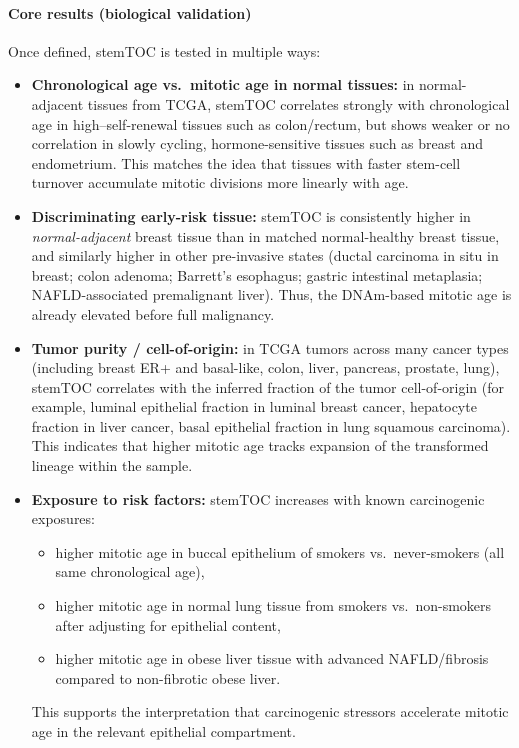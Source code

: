 \documentclass[10pt]{extarticle}
\begin{document}
\paragraph{Core results (biological validation)}
Once defined, stemTOC is tested in multiple ways:
\begin{itemize}[label=-]
  \item \textbf{Chronological age vs.\ mitotic age in normal tissues:} in normal-adjacent tissues from TCGA, stemTOC correlates strongly with chronological age in high–self-renewal tissues such as colon/rectum, but shows weaker or no correlation in slowly cycling, hormone-sensitive tissues such as breast and endometrium. This matches the idea that tissues with faster stem-cell turnover accumulate mitotic divisions more linearly with age.
  \item \textbf{Discriminating early-risk tissue:} stemTOC is consistently higher in \textit{normal-adjacent} breast tissue than in matched normal-healthy breast tissue, and similarly higher in other pre-invasive states (ductal carcinoma in situ in breast; colon adenoma; Barrett’s esophagus; gastric intestinal metaplasia; NAFLD-associated premalignant liver). Thus, the DNAm-based mitotic age is already elevated before full malignancy.
  \item \textbf{Tumor purity / cell-of-origin:} in TCGA tumors across many cancer types (including breast ER+ and basal-like, colon, liver, pancreas, prostate, lung), stemTOC correlates with the inferred fraction of the tumor cell-of-origin (for example, luminal epithelial fraction in luminal breast cancer, hepatocyte fraction in liver cancer, basal epithelial fraction in lung squamous carcinoma). This indicates that higher mitotic age tracks expansion of the transformed lineage within the sample.
  \item \textbf{Exposure to risk factors:} stemTOC increases with known carcinogenic exposures:
    \begin{itemize}[label=-]
      \item higher mitotic age in buccal epithelium of smokers vs.\ never-smokers (all same chronological age),
      \item higher mitotic age in normal lung tissue from smokers vs.\ non-smokers after adjusting for epithelial content,
      \item higher mitotic age in obese liver tissue with advanced NAFLD/fibrosis compared to non-fibrotic obese liver. 
    \end{itemize}
    This supports the interpretation that carcinogenic stressors accelerate mitotic age in the relevant epithelial compartment.

\end{itemize}
\end{document}
